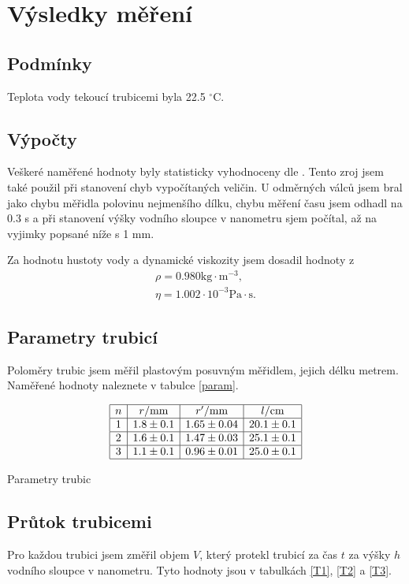 \documentclass[a4paper,12pt]{article}
\begin{document}
\section{Výsledky měření}

\subsection{Podmínky}
\noindent
Teplota vody tekoucí trubicemi byla 22.5 $^{\circ}$C.

\subsection{Výpočty}
\noindent
Veškeré naměřené hodnoty byly statisticky vyhodnoceny dle \cite{chyba}. Tento zroj jsem také použil při stanovení chyb vypočítaných veličin. 
U odměrných válců jsem bral jako chybu měřidla polovinu nejmenšího dílku, chybu měření času jsem odhadl na 0.3 s a při stanovení výšky 
vodního sloupce v nanometru sjem počítal, až na vyjimky popsané níže s 1 mm.

Za hodnotu hustoty vody a dynamické viskozity jsem dosadil hodnoty z \cite{tabulky}
\begin{eqnarray}
	\rho=0.980 \mbox{kg}\cdot\mbox{m}^{-3}, \\
	\eta=1.002 \cdot 10^{-3} \mbox{Pa}\cdot\mbox{s}.
\end{eqnarray}

\subsection{Parametry trubicí}
\noindent
Poloměry trubic jsem měřil plastovým posuvným měřidlem, jejich délku metrem. Naměřené hodnoty naleznete v tabulce \ref{param}.
\begin{table}
$$
\begin{array}{|c|c|c|c|}
\hline
n&	r/\mbox{mm}&	r'/\mbox{mm}&	l/\mbox{cm}	\\ \hline
1&	1.8 \pm 0.1&	1.65 \pm 0.04&	20.1 \pm 0.1	\\ \hline
2&	1.6 \pm 0.1&	1.47 \pm 0.03&	25.1 \pm 0.1	\\ \hline
3&	1.1 \pm 0.1&	0.96 \pm 0.01&	25.0 \pm 0.1	\\ \hline
\end{array}
$$
\caption{Parametry trubic}
\label{param}
\end{table}

\subsection{Průtok trubicemi}
\noindent
Pro každou trubici jsem změřil objem $V$, který protekl trubicí za čas $t$ za výšky $h$ vodního sloupce v nanometru. Tyto hodnoty jsou v tabulkách \ref{T1}, \ref{T2} a \ref{T3}.
\end{document}
